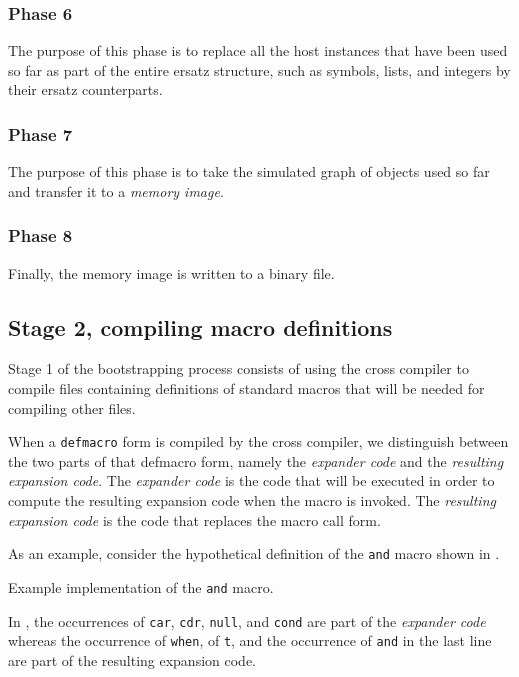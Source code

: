 \subsubsection{Phase 6}

The purpose of this phase is to replace all the host instances that
have been used so far as part of the entire ersatz structure, such as
symbols, lists, and integers by their ersatz counterparts.

\subsubsection{Phase 7}

The purpose of this phase is to take the simulated graph of objects
used so far and transfer it to a \emph{memory image}.  

\subsubsection{Phase 8}

Finally, the memory image is written to a binary file. 


\subsection{Stage 2, compiling macro definitions}

Stage 1 of the bootstrapping process consists of using the cross
compiler to compile files containing definitions of standard macros
that will be needed for compiling other files. 

When a \texttt{defmacro} form is compiled by the cross compiler, we
distinguish between the two parts of that defmacro form, namely the
\emph{expander code} and the \emph{resulting expansion code}.  The
\emph{expander code} is the code that will be executed in order to
compute the resulting expansion code when the macro is invoked.  The
\emph{resulting expansion code} is the code that replaces the macro
call form. 

As an example, consider the hypothetical definition of the
\texttt{and} macro shown in .

\begin{codefragment}
\caption{\label{code-defmacro-and}
Example implementation of the \texttt{and} macro.}
\end{codefragment}

In , the occurrences of \texttt{car},
\texttt{cdr}, \texttt{null}, and \texttt{cond} are part of the
\emph{expander code} whereas the occurrence of \texttt{when}, of
\texttt{t}, and the occurrence of \texttt{and} in the last line are
part of the resulting expansion code. 

